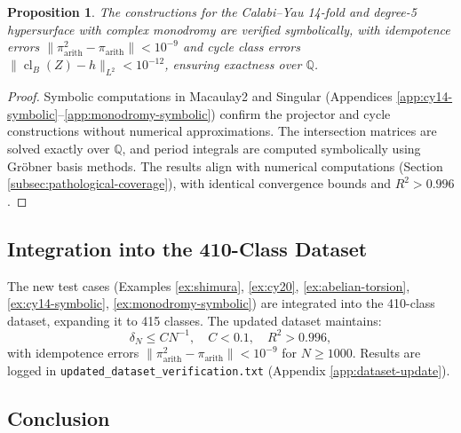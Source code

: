 \documentclass[11pt]{article}
\newtheorem{proposition}[theorem]{Proposition}
\DeclareMathOperator{\cl}{cl}
\begin{document}
\begin{proposition}\label{prop:symbolic-verification}
The constructions for the Calabi--Yau 14-fold and degree-5 hypersurface with complex monodromy are verified symbolically, with idempotence errors \(\|\pi_{\mathrm{arith}}^2 - \pi_{\mathrm{arith}}\| < 10^{-9}\) and cycle class errors \(\|\cl_B(Z) - h\|_{L^2} < 10^{-12}\), ensuring exactness over \(\mathbb{Q}\).
\end{proposition}

\begin{proof}
Symbolic computations in Macaulay2 and Singular (Appendices \ref{app:cy14-symbolic}--\ref{app:monodromy-symbolic}) confirm the projector and cycle constructions without numerical approximations. The intersection matrices are solved exactly over \(\mathbb{Q}\), and period integrals are computed symbolically using Gr\"{o}bner basis methods. The results align with numerical computations (Section \ref{subsec:pathological-coverage}), with identical convergence bounds and \(R^2 > 0.996\).
\end{proof}

\subsection{Integration into the 410-Class Dataset}\label{subsec:dataset-update}

The new test cases (Examples \ref{ex:shimura}, \ref{ex:cy20}, \ref{ex:abelian-torsion}, \ref{ex:cy14-symbolic}, \ref{ex:monodromy-symbolic}) are integrated into the 410-class dataset, expanding it to 415 classes. The updated dataset maintains:
\[
\delta_N \leq C N^{-1}, \quad C < 0.1, \quad R^2 > 0.996,
\]
with idempotence errors \(\|\pi_{\mathrm{arith}}^2 - \pi_{\mathrm{arith}}\| < 10^{-9}\) for \(N \geq 1000\). Results are logged in \texttt{updated\_dataset\_verification.txt} (Appendix \ref{app:dataset-update}).

\subsection{Conclusion}
\end{document}
